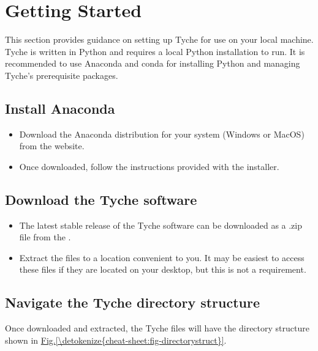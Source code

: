 \documentclass[letterpaper,10pt,english]{sphinxmanual}
\begin{document}
\section{Getting Started}
\label{\detokenize{cheat-sheet:getting-started}}
\sphinxAtStartPar
This section provides guidance on setting up Tyche for use on your local machine. Tyche is written in Python and requires a local Python installation to run. It is recommended to use Anaconda and conda for installing Python and managing Tyche’s prerequisite packages.


\subsection{Install Anaconda}
\label{\detokenize{cheat-sheet:install-anaconda}}\begin{itemize}
\item {} 
\sphinxAtStartPar
Download the Anaconda distribution for your system (Windows or MacOS) from the  website.

\item {} 
\sphinxAtStartPar
Once downloaded, follow the instructions provided with the installer.

\end{itemize}


\subsection{Download the Tyche software}
\label{\detokenize{cheat-sheet:download-the-tyche-software}}\begin{itemize}
\item {} 
\sphinxAtStartPar
The latest stable release of the Tyche software can be downloaded as a .zip file from the .

\item {} 
\sphinxAtStartPar
Extract the files to a location convenient to you. It may be easiest to access these files if they are located on your desktop, but this is not a requirement.

\end{itemize}


\subsection{Navigate the Tyche directory structure}
\label{\detokenize{cheat-sheet:navigate-the-tyche-directory-structure}}
\sphinxAtStartPar
Once downloaded and extracted, the Tyche files will have the directory structure shown in \hyperref[\detokenize{cheat-sheet:fig-directorystruct}]{Fig.\@ \ref{\detokenize{cheat-sheet:fig-directorystruct}}}.
\end{document}
